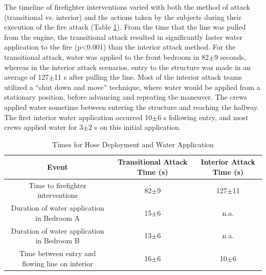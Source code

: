 \documentclass[12pt,oneside]{article}
\begin{document}
The timeline of firefighter interventions varied with both the method of attack (transitional vs. interior) and the actions taken by the subjects during their execution of the fire attack (Table \ref{tab:suppression_times}). From the time that the line was pulled from the engine, the transitional attack resulted in significantly faster water application to the fire (p<0.001) than the interior attack method. For the transitional attack, water was applied to the front bedroom in 82$\pm$9 seconds, whereas in the interior attack scenarios, entry to the structure was made in an average of 127$\pm$11 s after pulling the line. Most of the interior attack teams utilized a ``shut down and move'' technique, where water would be applied from a stationary position, before advancing and repeating the maneuver. The crews applied water sometime between entering the structure and reaching the hallway. The first interior water application occurred 10$\pm$6 s following entry, and most crews applied water for 3$\pm$2 s on this initial application. 

\begin{table}[!ht]
    \centering
    \caption{Times for Hose Deployment and Water Application}
    \label{tab:suppression_times}
    \begin{tabular}{ccc}
    \toprule[1.5pt]
 	 Event 											&	Transitional Attack Time (s)	& Interior Attack Time (s)	\\
 	\midrule 
 	Time to firefighter interventions				& 82$\pm$9							& 127$\pm$11				\\
 	Duration of water application in Bedroom A 		& 15$\pm$6							& n.a.						\\
 	Duration of water application in Bedroom B 		& 13$\pm$6							& n.a.						\\
 	Time between entry and flowing line on interior & 16$\pm$6							& 10$\pm$6  				\\
 	\bottomrule[1.25pt] 
    \end{tabular}
\end{table}
\end{document}
